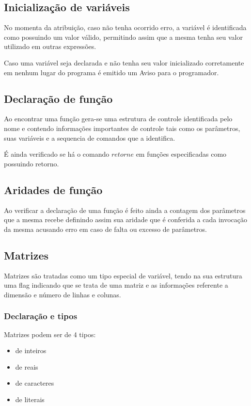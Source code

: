 \documentclass[a4paper,12pt]{report}
\begin{document}
\subsection{Inicializa\c{c}\~ao de vari\'aveis}

No momenta da atribui\c{c}\~ao, caso n\~ao tenha ocorrido erro, a vari\'avel \'e identificada como possuindo um valor v\'alido, permitindo assim que a mesma tenha seu valor utilizado em outras express\~oes.

Caso uma vari\'avel seja declarada e n\~ao tenha seu valor inicializado corretamente em nenhum lugar do programa \'e emitido um Aviso para o programador.

\subsection{Declara\c{c}\~ao de fun\c{c}\~ao}

Ao encontrar uma fun\c{c}\~ao gera-se uma estrutura de controle identificada pelo nome e contendo informa\c{c}\~oes importantes de controle tais como os par\^ametros, suas vari\'aveis e a sequencia de comandos que a identifica.

\'E ainda verificado se h\'a o comando $retorne$ em fun\c{c}\~oes especificadas como possuindo retorno.

\subsection{Aridades de fun\c{c}\~ao}

Ao verificar a declara\c{c}\~ao de uma fun\c{c}\~ao \'e feito ainda a contagem dos par\^ametros 
que a mesma recebe definindo assim sua aridade que \'e conferida a cada invoca\c{c}\~ao da mesma
acusando erro em caso de falta ou excesso de par\^ametros.

\subsection{Matrizes}

Matrizes s\~ao tratadas como um tipo especial de vari\'avel, tendo na sua 
estrutura uma flag indicando que se trata de uma matriz e as informa\c{c}\~oes referente a 
dimens\~ao e n\'umero de linhas e colunas.

\subsubsection{Declara\c{c}\~ao e tipos}
Matrizes podem ser de 4 tipos:
\begin{itemize}
	\item de inteiros
    \item de reais
    \item de caracteres
    \item de literais
\end{itemize}
\end{document}
